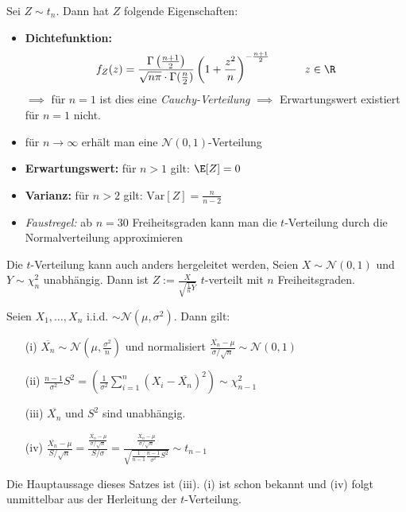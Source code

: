 Sei $Z \sim t_n$. Dann hat $Z$ folgende Eigenschaften:
\begin{itemize}
\item \textbf{Dichtefunktion:} $$f_Z(z) = \frac{\Gamma\left( \frac{n+1}{2}\right)}{\sqrt{n\pi} \cdot \Gamma(\frac{n}{2})} \left(1 + \frac{z^2}{n}\right)^{- \frac{n+1}{2}} \quad \quad \quad z \in \R$$
$\implies$ für $n=1$ ist dies eine \textit{Cauchy-Verteilung} $\implies$ Erwartungswert existiert für $n=1$ nicht.
\item für $n\to \infty$ erhält man eine $\mathcal{N}(0,1)$-Verteilung 
\item \textbf{Erwartungswert:} für $n>1$ gilt: $\E[Z] = 0$
\item \textbf{Varianz:} für $n>2$ gilt: $\mathrm{Var}[Z] = \frac{n}{n-2}$
\item \textit{Faustregel:} ab $n=30$ Freiheitsgraden kann man die $t$-Verteilung durch die Normalverteilung approximieren
\end{itemize}
Die $t$-Verteilung kann auch anders hergeleitet werden, Seien $X \sim \mathcal{N}(0,1)$ und $Y \sim \chi_n^2$ unabhängig. Dann ist $Z:= \frac{X}{\sqrt{\frac{1}{n} Y}}$ $t$-verteilt mit $n$ Freiheitsgraden.

\begin{satz}
Seien $X_1,\dots, X_n$ i.i.d. $\sim \mathcal{N}(\mu,\sigma^2)$. Dann gilt:
\begin{itemize}
\item[(i)] $\overline{X_n} \sim \mathcal{N}\left(\mu, \frac{\sigma^2}{n}\right)$ und normalisiert $\frac{\overline{X_n}-\mu}{\sigma / \sqrt{n}} \sim \mathcal{N}(0,1)$
\item[(ii)] $\frac{n-1}{\sigma^2}S^2 = \left(\frac{1}{\sigma^2} \sum_{i=1}^n (X_i - \overline{X_n})^2 \right) \sim \chi_{n-1}^2$
\item[(iii)] $\overline{X_n}$ und $S^2$ sind unabhängig.
\item[(iv)] $\frac{\overline{X_n}-\mu}{S / \sqrt{n}} = \frac{\frac{\overline{X_n}-\mu}{\sigma / \sqrt{n}}}{S/\sigma} = \frac{\frac{\overline{X_n}-\mu}{\sigma / \sqrt{n}}}{\sqrt{\frac{1}{n-1} \frac{n-1}{\sigma^2} S^2}} \sim t_{n-1}$
\end{itemize}
\end{satz}
Die Hauptaussage dieses Satzes ist (iii). (i) ist schon bekannt und (iv) folgt unmittelbar aus der Herleitung der $t$-Verteilung.


